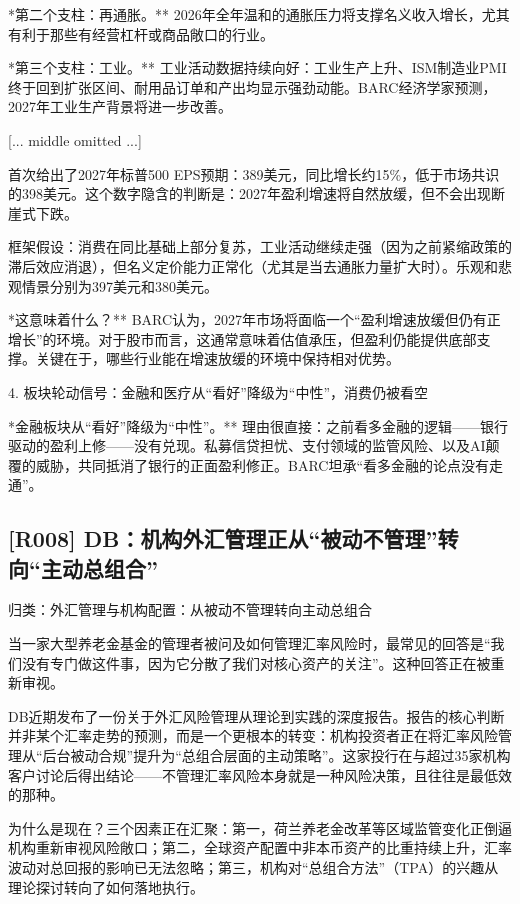 \documentclass[11pt]{ctexart}
\begin{document}
*第二个支柱：再通胀。** 2026年全年温和的通胀压力将支撑名义收入增长，尤其有利于那些有经营杠杆或商品敞口的行业。

*第三个支柱：工业。** 工业活动数据持续向好：工业生产上升、ISM制造业PMI终于回到扩张区间、耐用品订单和产出均显示强劲动能。BARC经济学家预测，2027年工业生产背景将进一步改善。



[... middle omitted ...]

首次给出了2027年标普500 EPS预期：389美元，同比增长约15\%，低于市场共识的398美元。这个数字隐含的判断是：2027年盈利增速将自然放缓，但不会出现断崖式下跌。

框架假设：消费在同比基础上部分复苏，工业活动继续走强（因为之前紧缩政策的滞后效应消退），但名义定价能力正常化（尤其是当去通胀力量扩大时）。乐观和悲观情景分别为397美元和380美元。

*这意味着什么？** BARC认为，2027年市场将面临一个“盈利增速放缓但仍有正增长”的环境。对于股市而言，这通常意味着估值承压，但盈利仍能提供底部支撑。关键在于，哪些行业能在增速放缓的环境中保持相对优势。

4. 板块轮动信号：金融和医疗从“看好”降级为“中性”，消费仍被看空

*金融板块从“看好”降级为“中性”。** 理由很直接：之前看多金融的逻辑——银行驱动的盈利上修——没有兑现。私募信贷担忧、支付领域的监管风险、以及AI颠覆的威胁，共同抵消了银行的正面盈利修正。BARC坦承“看多金融的论点没有走通”。

\subsection{[R008] DB：机构外汇管理正从“被动不管理”转向“主动总组合”}
{\small\color{refgray}归类：外汇管理与机构配置：从被动不管理转向主动总组合}

当一家大型养老金基金的管理者被问及如何管理汇率风险时，最常见的回答是“我们没有专门做这件事，因为它分散了我们对核心资产的关注”。这种回答正在被重新审视。

DB近期发布了一份关于外汇风险管理从理论到实践的深度报告。报告的核心判断并非某个汇率走势的预测，而是一个更根本的转变：机构投资者正在将汇率风险管理从“后台被动合规”提升为“总组合层面的主动策略”。这家投行在与超过35家机构客户讨论后得出结论——不管理汇率风险本身就是一种风险决策，且往往是最低效的那种。

为什么是现在？三个因素正在汇聚：第一，荷兰养老金改革等区域监管变化正倒逼机构重新审视风险敞口；第二，全球资产配置中非本币资产的比重持续上升，汇率波动对总回报的影响已无法忽略；第三，机构对“总组合方法”（TPA）的兴趣从理论探讨转向了如何落地执行。
\end{document}
